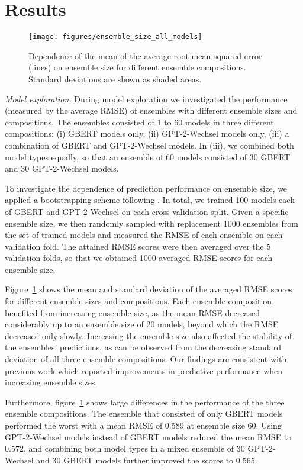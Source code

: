 \documentclass[11pt,a4paper]{article}
\begin{document}
\section{Results}

\begin{figure}[t]
    \texttt{[image: figures/ensemble\_size\_all\_models]}
    \caption{Dependence of the mean of the average root mean squared error (lines) on ensemble size for different ensemble compositions. Standard deviations are shown as shaded areas.}
    \label{fig:ensemble}
\end{figure}

\emph{Model exploration.}
During model exploration we investigated the performance (measured by the average RMSE) of ensembles with different ensemble sizes and compositions.
The ensembles consisted of 1 to 60 models in three different compositions: (i) GBERT models only, (ii) GPT-2-Wechsel models only, (iii) a combination of GBERT and \mbox{GPT-2-Wechsel} models.
In (iii), we combined both model types equally, so that an ensemble of 60 models consisted of 30 GBERT and 30 GPT-2-Wechsel models.

To investigate the dependence of prediction performance on ensemble size, we applied a bootstrapping scheme following \cite{Risch2020,Bornheim2021}.
In total, we trained 100 models each of GBERT and GPT-2-Wechsel on each cross-validation split.
Given a specific ensemble size, we then randomly sampled with replacement 1000 ensembles from the set of trained models and measured the RMSE of each ensemble on each validation fold.
The attained RMSE scores were then averaged over the 5 validation folds, so that we obtained 1000 averaged RMSE scores for each ensemble size.

Figure~\ref{fig:ensemble} shows the mean and standard deviation of the averaged RMSE scores for different ensemble sizes and compositions.
Each ensemble composition benefited from increasing ensemble size, as the mean RMSE decreased considerably up to an ensemble size of 20 models, beyond which the RMSE decreased only slowly.
Increasing the ensemble size also affected the stability of the ensembles' predictions, as can be observed from the decreasing standard deviation of all three ensemble compositions.
Our findings are consistent with previous work \cite{Risch2020,Bornheim2021} which reported improvements in predictive performance when increasing ensemble sizes.

Furthermore, figure~\ref{fig:ensemble} shows large differences in the performance of the three ensemble compositions.
The ensemble that consisted of only GBERT models performed the worst with a mean RMSE of 0.589 at ensemble size 60.
Using \mbox{GPT-2-Wechsel} models instead of GBERT models reduced the mean RMSE to 0.572, and combining both model types in a mixed ensemble of 30 GPT-2-Wechsel and 30 GBERT models further improved the scores to 0.565.
\end{document}
